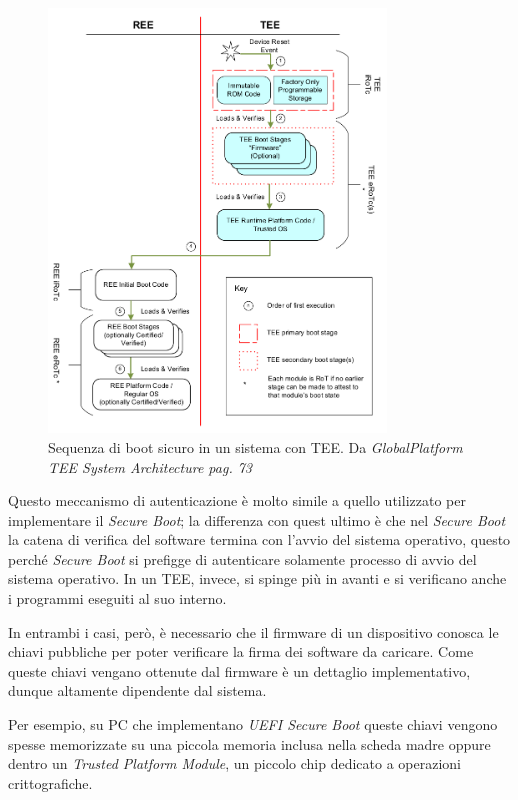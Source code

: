 \documentclass[12pt,italian]{report}
\begin{document}
\begin{figure}
\centering
\includegraphics[width=0.8\textwidth]{immagini/tee-boot-sequence}
\caption{
    Sequenza di boot sicuro in un sistema con TEE. 
    Da \textit{GlobalPlatform TEE System Architecture pag. 73}
    \cite{gp2020systemarchitecture}
}
\end{figure}

Questo meccanismo di autenticazione è molto simile a quello utilizzato per
implementare il \textit{Secure Boot}; la differenza con quest ultimo è che
nel \textit{Secure Boot} la catena di verifica del software termina con
l'avvio del sistema operativo, questo perché \textit{Secure Boot} si prefigge
di autenticare solamente processo di avvio del sistema operativo.
In un TEE, invece, si spinge più in avanti e si verificano anche i programmi
eseguiti al suo interno.

In entrambi i casi, però, è necessario che il firmware di un dispositivo
conosca le chiavi pubbliche per poter verificare la firma dei software
da caricare. Come queste chiavi vengano ottenute dal firmware è un dettaglio
implementativo, dunque altamente dipendente dal sistema.

Per esempio, su PC che implementano \textit{UEFI Secure Boot} queste chiavi
vengono spesse memorizzate su una piccola memoria inclusa nella scheda madre %
oppure dentro un \textit{Trusted Platform Module}, %
un piccolo chip dedicato a operazioni crittografiche.
\end{document}
